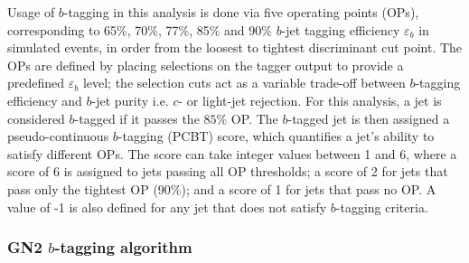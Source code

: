 \documentclass[../thesis.tex]{subfiles}
\begin{document}
Usage of $b$-tagging in this analysis is done via five operating points (\acs{OP}s), corresponding to 65\%, 70\%, 77\%, 85\% and 90\% $b$-jet tagging efficiency $\varepsilon_b$ in simulated \ttbar events, in order from the loosest to tightest discriminant cut point.
The \acs{OP}s are defined by placing selections on the tagger output to provide a predefined $\varepsilon_b$ level; the selection cuts act as a variable trade-off between $b$-tagging efficiency and $b$-jet purity i.e. $c$- or light-jet rejection. For this analysis, a jet is considered $b$-tagged if it passes the $85\%$ \acs{OP}. The $b$-tagged jet is then assigned a pseudo-continuous $b$-tagging (\acs{PCBT}) score, which quantifies a jet's ability to satisfy different \acs{OP}s. The score can take integer values between 1 and 6, where a score of 6 is assigned to jets passing all \acs{OP} thresholds; a score of 2 for jets that pass only the tightest OP (90\%); and a score of 1 for jets that pass no \acs{OP}. A value of -1 is also defined for any jet that does not satisfy $b$-tagging criteria. 

\subsubsection*{GN2 $b$-tagging algorithm}
\label{sec:gn2}
\end{document}
